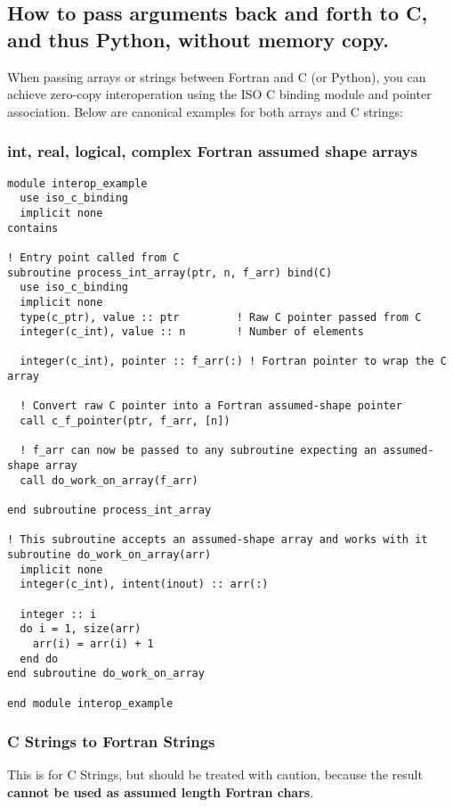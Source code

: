 \documentclass{article}
\begin{document}
\subsection{How to pass arguments back and forth to C, and thus Python, without memory copy.}

When passing arrays or strings between Fortran and C (or Python), you can achieve zero-copy interoperation using the ISO C binding module and pointer association. Below are canonical examples for both arrays and C strings:

\subsubsection*{int, real, logical, complex Fortran assumed shape arrays}

\begin{verbatim}
module interop_example
  use iso_c_binding
  implicit none
contains

! Entry point called from C
subroutine process_int_array(ptr, n, f_arr) bind(C)
  use iso_c_binding
  implicit none
  type(c_ptr), value :: ptr         ! Raw C pointer passed from C
  integer(c_int), value :: n        ! Number of elements

  integer(c_int), pointer :: f_arr(:) ! Fortran pointer to wrap the C array

  ! Convert raw C pointer into a Fortran assumed-shape pointer
  call c_f_pointer(ptr, f_arr, [n])

  ! f_arr can now be passed to any subroutine expecting an assumed-shape array
  call do_work_on_array(f_arr)

end subroutine process_int_array

! This subroutine accepts an assumed-shape array and works with it
subroutine do_work_on_array(arr)
  implicit none
  integer(c_int), intent(inout) :: arr(:)

  integer :: i
  do i = 1, size(arr)
    arr(i) = arr(i) + 1
  end do
end subroutine do_work_on_array

end module interop_example
\end{verbatim}

\subsubsection*{C Strings to Fortran Strings}

This is for C Strings, but should be treated with caution, because the result \textbf{cannot be used as assumed length Fortran chars}.
\end{document}
